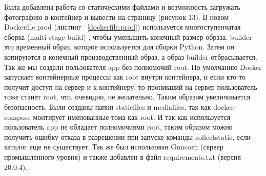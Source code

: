 	Была добавлена работа со статическими файлами и возможность загружать фотографию в контейнер и вывести на страницу (рисунок 13).
	В новом \textsf{Dockerfile.prod} (листинг ~\ref{dockerfile.prod}) используется многоступенчатая сборка (\textsf{multi-stage build}) , чтобы уменьшить конечный размер образа. \textsf{builder} — это временный образ, которое используется для сборки \textsf{Python}. Затем он копируются в конечный производственный образ, а образ \textsf{builder} отбрасывается. Так же мы создали пользователя app без полномочий \textsf{root}. По умолчанию \textsf{Docker} запускает контейнерные процессы как \textsf{root} внутри контейнера, и если кто-то получит доступ на сервер и к контейнеру, то проникший на сервер пользователь тоже станет \textsf{root}, что, очевидно, не желательно. Таким образом увеличивается безопасность. Были созданы папки \textsf{staticfiles} и \textsf{mediafiles}, так как \textsf{docker-compose} монтирует именованные тома как \textsf{root}. И так как используется пользователь \textsf{app} не обладает полномочиями \textsf{root}, таким образом можно получить ошибку отказа в разрешении при запуске команды \textsf{collectstatic}, если каталог еще не существует.
	Так же был использован \textsf{Guncorn} (сервер промышленного уровня) и также добавлен в файл \textsf{requirements.txt} (версия \textsf{20.0.4}).


